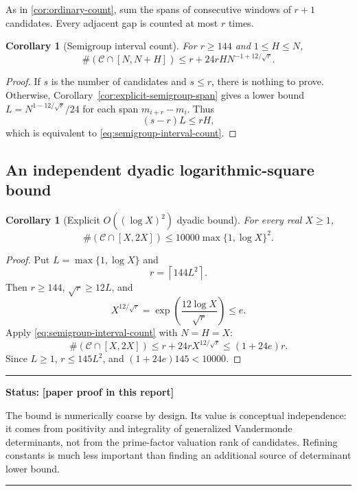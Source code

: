 \documentclass[11pt,oneside]{article}
\newtheorem{corollary}[theorem]{Corollary}
\theoremstyle{definition}
\theoremstyle{remark}
\newcommand{\Cand}{\mathcal C}
\newcommand{\statusnew}{\textcolor{newgreen}{\textbf{[paper proof in this report]}}}
\newenvironment{statusbox}[1]
{\begin{center}\begin{minipage}{0.94\textwidth}\raggedright\hbadness=10000\hrule\vspace{0.45em}\textbf{Status:} #1\par\vspace{0.35em}}
{\vspace{0.35em}\hrule\end{minipage}\end{center}}
\begin{document}
As in \cref{cor:ordinary-count}, sum the spans of consecutive windows of $r+1$ candidates.
Every adjacent gap is counted at most $r$ times.

\begin{corollary}[Semigroup interval count]
\label{cor:semigroup-interval-count}
For $r\ge144$ and $1\le H\le N$,
\begin{equation}
 \#(\Cand\cap[N,N+H])
 \le r+24rH N^{-1+12/\sqrt r}.
 \label{eq:semigroup-interval-count}
\end{equation}
\end{corollary}

\begin{proof}
If $s$ is the number of candidates and $s\le r$, there is nothing to prove.  Otherwise,
Corollary~\ref{cor:explicit-semigroup-span} gives a lower bound
$L=N^{1-12/\sqrt r}/24$ for each span $m_{i+r}-m_i$.  Thus
\[
 (s-r)L\le rH,
\]
which is equivalent to \eqref{eq:semigroup-interval-count}.
\end{proof}

\subsection{An independent dyadic logarithmic-square bound}

\begin{corollary}[Explicit $O((\log X)^2)$ dyadic bound]
\label{cor:semigroup-log-square}
For every real $X\ge1$,
\begin{equation}
 \#(\Cand\cap[X,2X])
 \le10000\max\{1,\log X\}^2.
 \label{eq:semigroup-log-square}
\end{equation}
\end{corollary}

\begin{proof}
Put $L=\max\{1,\log X\}$ and
\[
 r=\left\lceil144L^2\right\rceil.
\]
Then $r\ge144$, $\sqrt r\ge12L$, and
\[
 X^{12/\sqrt r}
 =\exp\!\left(\frac{12\log X}{\sqrt r}\right)
 \le e.
\]
Apply \eqref{eq:semigroup-interval-count} with $N=H=X$:
\[
 \#(\Cand\cap[X,2X])
 \le r+24rX^{12/\sqrt r}
 \le(1+24e)r.
\]
Since $L\ge1$, $r\le145L^2$, and
$(1+24e)145<10000$.
\end{proof}

\begin{statusbox}{\statusnew}
The bound is numerically coarse by design.  Its value is conceptual independence: it comes
from positivity and integrality of generalized Vandermonde determinants, not from the
prime-factor valuation rank of candidates.  Refining constants is much less important than
finding an additional source of determinant lower bound.
\end{statusbox}
\end{document}
